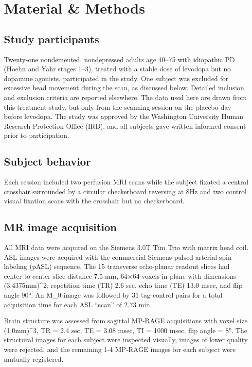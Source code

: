 \section{Material \& Methods}

\subsection{Study participants}
Twenty-one nondemented, nondepressed adults age 40–75 with idiopathic PD (Hoehn and Yahr stages 1–3),\cite{6067254} treated with a stable dose of levodopa but no dopamine agonists, participated in the study. One subject was excluded for excessive head movement during the scan, as discussed below. Detailed inclusion and exclusion criteria are reported elsewhere.\cite{Black_2010} The data used here are drawn from this treatment study,\cite{Black_2010} but only from the scanning session on the placebo day before levodopa. The study was approved by the Washington University Human Research Protection Office (IRB), and all subjects gave written informed consent prior to participation.  

\subsection{Subject behavior}
Each session included two perfusion MRI scans while the subject fixated a central crosshair surrounded by a circular checkerboard reversing at 8Hz and two control visual fixation scans with the crosshair but no checkerboard. 

\subsection{MR image acquisition}
All MRI data were acquired on the Siemens 3.0T Tim Trio with matrix head coil. ASL images were acquired with the commercial Siemens pulsed arterial spin labeling (pASL) sequence.\cite{Wang_2003} The 15 transverse echo-planar readout slices had center-to-center slice distance 7.5 mm, 64$\times$64 voxels in plane with dimensions (3.4375mm)^2, repetition time (TR) 2.6 sec, echo time (TE) 13.0 msec, and flip angle 90°. An M_0 image was followed by 31 tag-control pairs for a total acquisition time for each ASL ``scan'' of 2.73 min.

Brain structure was assessed from sagittal MP-RAGE acquisitions with voxel size (1.0mm)^3, TR = 2.4 sec, TE = 3.08 msec, TI = 1000 msec, flip angle = 8°. The structural images for each subject were inspected visually, images of lower quality were rejected, and the remaining 1-4 MP-RAGE images for each subject were mutually registered.


